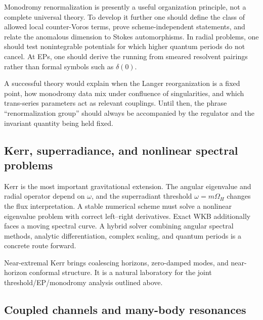 Monodromy renormalization is presently a useful organization principle, not a
complete universal theory.  To develop it further one should define the class
of allowed local counter-Voros terms, prove scheme-independent statements,
and relate the anomalous dimension to Stokes automorphisms.  In radial
problems, one should test nonintegrable potentials for which higher quantum
periods do not cancel.  At EPs, one should derive the running from smeared
resolvent pairings rather than formal symbols such as $\delta(0)$.

A successful theory would explain when the Langer reorganization is a fixed
point, how monodromy data mix under confluence of singularities, and which
trans-series parameters act as relevant couplings.  Until then, the phrase
``renormalization group'' should always be accompanied by the regulator and
the invariant quantity being held fixed.

\subsection{Kerr, superradiance, and nonlinear spectral problems}
\label{subsec:open-kerr}

Kerr is the most important gravitational extension.  The angular eigenvalue
and radial operator depend on $\omega$, and the superradiant threshold
$\omega=m\Omega_H$ changes the flux interpretation.  A stable numerical
scheme must solve a nonlinear eigenvalue problem with correct left--right
derivatives.  Exact WKB additionally faces a moving spectral curve.  A hybrid
solver combining angular spectral methods, analytic differentiation, complex
scaling, and quantum periods is a concrete route forward.

Near-extremal Kerr brings coalescing horizons, zero-damped modes, and
near-horizon conformal structure.  It is a natural laboratory for the joint
threshold/EP/monodromy analysis outlined above.

\subsection{Coupled channels and many-body resonances}
\label{subsec:open-manybody}

